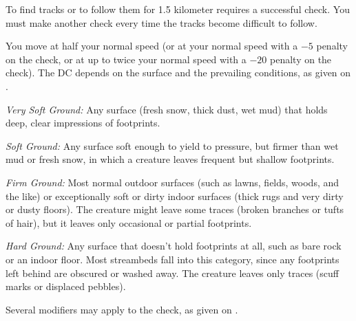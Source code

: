 {}{}
{To find tracks or to follow them for 1.5 kilometer requires a successful  check. You must make another  check every time the tracks become difficult to follow.

You move at half your normal speed (or at your normal speed with a $-5$ penalty on the check, or at up to twice your normal speed with a $-20$ penalty on the check). The DC depends on the surface and the prevailing conditions, as given on .



\textit{Very Soft Ground:} Any surface (fresh snow, thick dust, wet mud) that holds deep, clear impressions of footprints.

\textit{Soft Ground:} Any surface soft enough to yield to pressure, but firmer than wet mud or fresh snow, in which a creature leaves frequent but shallow footprints.

\textit{Firm Ground:} Most normal outdoor surfaces (such as lawns, fields, woods, and the like) or exceptionally soft or dirty indoor surfaces (thick rugs and very dirty or dusty floors). The creature might leave some traces (broken branches or tufts of hair), but it leaves only occasional or partial footprints.

\textit{Hard Ground:} Any surface that doesn't hold footprints at all, such as bare rock or an indoor floor. Most streambeds fall into this category, since any footprints left behind are obscured or washed away. The creature leaves only traces (scuff marks or displaced pebbles).

Several modifiers may apply to the  check, as given on .

}
